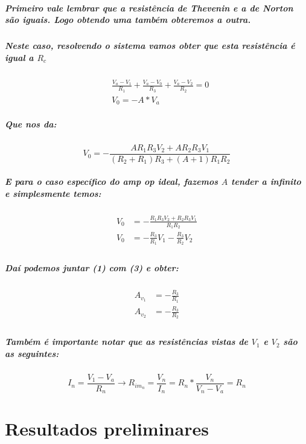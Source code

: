 \documentclass[12pt,twoside, a4paper, twocolumn]{article}
\begin{document}
\subparagraph*{Primeiro vale lembrar que a resistência de Thevenin e a de Norton são iguais. Logo obtendo uma também obteremos a outra.
}

\subparagraph*{Neste caso, resolvendo o sistema vamos obter que esta resistência é igual a $R_{c}$}

\begin{equation}
    \begin{aligned}
         & \frac{V_a - V_1}{R_1} + \frac{V_a-V_0}{R_3} + \frac{V_a-V_2}{R_2} = 0 \\
         & V_0 = -A*V_a
    \end{aligned}
\end{equation}

\subparagraph*{Que nos da:}

\begin{equation}
    V_0 = -\frac{A R_1 R_3 V_2 + A R_2 R_3 V_1}{(R_2 + R_1)R_3 + (A + 1) R_1 R_2}
\end{equation}

\subparagraph*{E para o caso específico do amp op ideal, fazemos $A$ tender a infinito e simplesmente temos:}

\begin{equation}
    \begin{aligned}
        V_0 & = -\frac{R_1 R_3 V_2 + R_2 R_3 V_1}{R_1 R_2} \\
        V_0 & = - \frac{R_3}{R_1}V_1 - \frac{R_3}{R_2}V_2  \\
    \end{aligned}
\end{equation}

\subparagraph*{Daí podemos juntar (1) com (3) e obter:}

\begin{equation}
    \begin{aligned}
        A_{v_1} & = -\frac{R_3}{R_1} \\
        A_{v_2} & = -\frac{R_3}{R_2} \\
    \end{aligned}
\end{equation}


\subparagraph*{Também é importante notar que as resistências vistas de $V_1$ e $V_2$ são as seguintes:}
\begin{equation}
    I_n = \frac{V_1-V_a}{R_n} \rightarrow R_{im_n} = \frac
    {V_n}{I_n} = R_n * \frac{V_n}{V_n - V_a} = R_n
\end{equation}

\section{Resultados preliminares}
\end{document}
